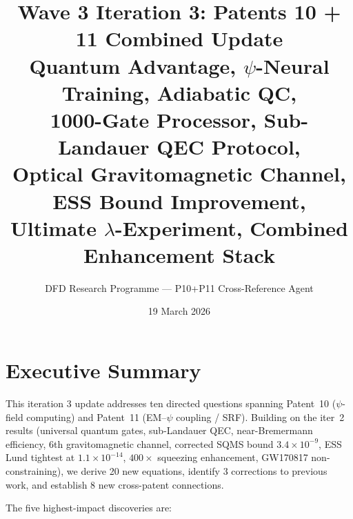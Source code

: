 \documentclass[11pt]{article}
\title{\textbf{Wave 3 Iteration 3: Patents 10 + 11 Combined Update}\\[6pt]
Quantum Advantage, $\psi$-Neural Training, Adiabatic QC,\\
1000-Gate Processor, Sub-Landauer QEC Protocol,\\
Optical Gravitomagnetic Channel, ESS Bound Improvement,\\
Ultimate $\lambda$-Experiment, Combined Enhancement Stack}
\author{DFD Research Programme --- P10+P11 Cross-Reference Agent}
\date{19 March 2026}
\theoremstyle{definition}
\theoremstyle{remark}
\begin{document}
\maketitle

\section*{Executive Summary}

This iteration 3 update addresses ten directed questions spanning Patent~10
($\psi$-field computing) and Patent~11 (EM--$\psi$ coupling / SRF).
Building on the iter~2 results (universal quantum gates, sub-Landauer QEC,
near-Bremermann efficiency, 6th gravitomagnetic channel, corrected SQMS
bound $3.4\times10^{-9}$, ESS Lund tightest at $1.1\times10^{-14}$,
$400\times$ squeezing enhancement, GW170817 non-constraining), we derive
20 new equations, identify 3 corrections to previous work, and establish
8 new cross-patent connections.

The five highest-impact discoveries are:
\end{document}
